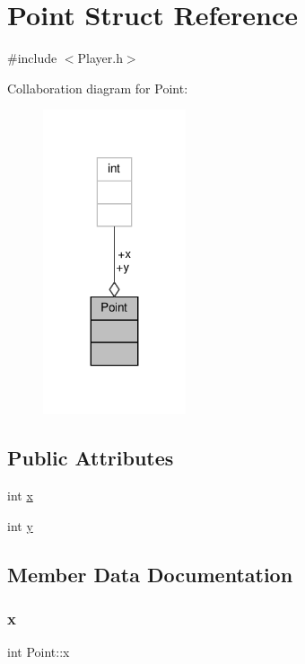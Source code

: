 \hypertarget{structPoint}{}\section{Point Struct Reference}
\label{structPoint}


{\ttfamily \#include $<$Player.\+h$>$}



Collaboration diagram for Point\+:\nopagebreak
\begin{figure}[H]
\begin{center}
\leavevmode
\includegraphics[width=119pt]{structPoint__coll__graph}
\end{center}
\end{figure}
\subsection*{Public Attributes}
\begin{DoxyCompactItemize}
\item 
int \hyperlink{structPoint_a8c779e11e694b20e0946105a9f5de842}{x}
\item 
int \hyperlink{structPoint_a2e1b5fb2b2a83571f5c0bc0f66a73cf7}{y}
\end{DoxyCompactItemize}


\subsection{Member Data Documentation}
\mbox{\label{structPoint_a8c779e11e694b20e0946105a9f5de842}} 
\subsubsection{\texorpdfstring{x}{x}}
{\footnotesize\ttfamily int Point\+::x}

